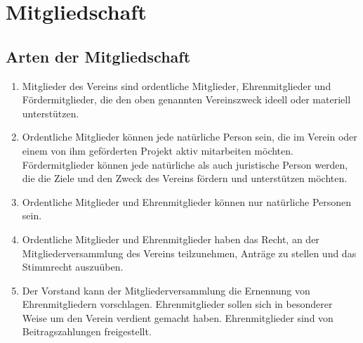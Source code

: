 \documentclass[12pt,a4paper,draft]{article}
\begin{document}
\section{Mitgliedschaft}
\subsection{Arten der Mitgliedschaft}
\begin{enumerate}
\item Mitglieder des Vereins sind ordentliche Mitglieder, Ehrenmitglieder und 
Fördermitglieder, die den oben genannten Vereinszweck ideell oder materiell 
unterstützen.

\item Ordentliche Mitglieder können jede natürliche Person sein,  die im Verein oder einem von
ihm geförderten Projekt aktiv mitarbeiten möchten. Fördermitglieder können jede natürliche
als auch juristische Person werden, die die Ziele und den
Zweck des Vereins fördern und unterstützen möchten.

\item Ordentliche Mitglieder und Ehrenmitglieder können nur natürliche Personen 
sein.

\item Ordentliche Mitglieder und Ehrenmitglieder haben das Recht, an der 
Mitgliederversammlung des Vereins teilzunehmen, Anträge zu stellen und das 
Stimmrecht auszuüben.

\item Der Vorstand kann der Mitgliederversammlung die Ernennung von 
Ehrenmitgliedern vorschlagen.  Ehrenmitglieder sollen sich in besonderer Weise um den Verein verdient gemacht haben. Ehrenmitglieder sind von Beitragszahlungen 
freigestellt. 
\end{enumerate}
\end{document}
